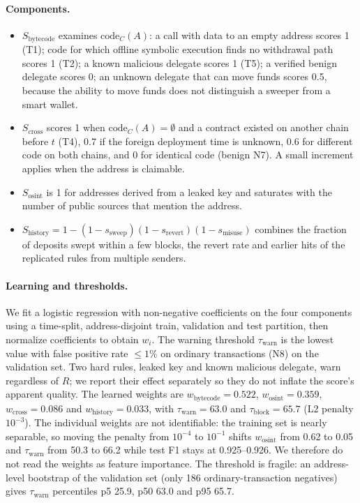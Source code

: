 \documentclass[runningheads]{llncs}
\newcommand{\code}[2]{\mathrm{code}_{#1}(#2)}
\begin{document}
\paragraph{Components.}
\begin{itemize}
\item $S_{\mathrm{bytecode}}$ examines $\code{C}{A}$: a call with data to an empty
address scores 1 (T1); code for which offline symbolic execution finds no
withdrawal path scores 1 (T2); a known malicious delegate scores 1 (T5); a
verified benign delegate scores 0; an unknown delegate that can move funds
scores 0.5, because the ability to move funds does not distinguish a sweeper from
a smart wallet.
\item $S_{\mathrm{cross}}$ scores 1 when $\code{C}{A}=\emptyset$ and a contract
existed on another chain before $t$ (T4), 0.7 if the foreign deployment time is
unknown, 0.6 for different code on both chains, and 0 for identical code
(benign N7). A small increment applies when the address is claimable.
\item $S_{\mathrm{osint}}$ is 1 for addresses derived from a leaked key and
saturates with the number of public sources that mention the address.
\item $S_{\mathrm{history}}=1-(1-s_{\mathrm{sweep}})(1-s_{\mathrm{revert}})(1-s_{\mathrm{misuse}})$
combines the fraction of deposits swept within a few blocks, the revert rate and
earlier hits of the replicated rules from multiple senders.
\end{itemize}

\paragraph{Learning and thresholds.} We fit a logistic regression with
non-negative coefficients on the four components using a time-split, address-disjoint
train, validation and test partition, then normalize coefficients to obtain $w_i$.
The warning threshold $\tau_{\mathrm{warn}}$ is the lowest value with false
positive rate $\le1\%$ on ordinary transactions (N8) on the validation set.
Two hard rules, leaked key and known malicious delegate, warn regardless of $R$;
we report their effect separately so they do not inflate the score's apparent
quality. The learned weights are $w_{\mathrm{bytecode}}=0.522$,
$w_{\mathrm{osint}}=0.359$, $w_{\mathrm{cross}}=0.086$ and
$w_{\mathrm{history}}=0.033$, with $\tau_{\mathrm{warn}}=63.0$ and
$\tau_{\mathrm{block}}=65.7$ (L2 penalty $10^{-3}$). The individual weights are
not identifiable: the training set is nearly separable, so moving the penalty from
$10^{-4}$ to $10^{-1}$ shifts $w_{\mathrm{osint}}$ from 0.62 to 0.05 and
$\tau_{\mathrm{warn}}$ from 50.3 to 66.2 while test F1 stays at 0.925--0.926.
We therefore do not read the weights as feature importance. The threshold is fragile: an address-level
bootstrap of the validation set (only 186 ordinary-transaction negatives) gives
$\tau_{\mathrm{warn}}$ percentiles p5 25.9, p50 63.0 and p95 65.7.
\end{document}
